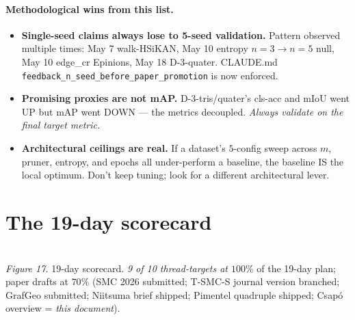 \documentclass[11pt,a4paper]{article}
\theoremstyle{plain}
\theoremstyle{definition}
\newcommand{\code}[1]{\texttt{\small #1}}
\begin{document}
\paragraph{Methodological wins from this list.}
\begin{itemize}
\item \textbf{Single-seed claims always lose to 5-seed validation.}
      Pattern observed multiple times: May 7 walk-HSiKAN, May 10
      entropy $n{=}3 \to n{=}5$ null, May 10 edge\_cr Epinions,
      May 18 D-3-quater. CLAUDE.md
      \code{feedback\_n\_seed\_before\_paper\_promotion} is now
      enforced.
\item \textbf{Promising proxies are not mAP.} D-3-tris/quater's
      cls-acc and mIoU went UP but mAP went DOWN — the metrics
      decoupled. \emph{Always validate on the final target metric.}
\item \textbf{Architectural ceilings are real.} If a dataset's
      $5$-config sweep across $m$, pruner, entropy, and epochs all
      under-perform a baseline, the baseline IS the local optimum.
      Don't keep tuning; look for a different architectural lever.
\end{itemize}

\section{The 19-day scorecard}

\begin{center}
\\[2pt]
\small\textit{Figure 17.} 19-day scorecard. \emph{9 of 10 thread-targets at
$100\%$} of the 19-day plan; paper drafts at $70\%$ (SMC 2026
submitted; T-SMC-S journal version branched; GrafGeo submitted;
Niitsuma brief shipped; Pimentel quadruple shipped; Csap\'o
overview = \emph{this document}).
\end{center}
\end{document}
